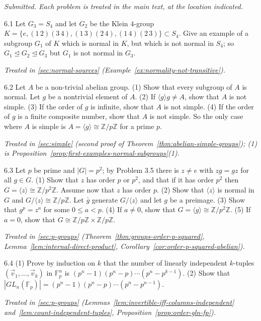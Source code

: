 \documentclass[11pt]{report}
\begin{document}
\textit{Submitted. Each problem is treated in the main text, at the location indicated.}

\begin{hwbox}{6.1}\label{hw:6.1}
Let $G_3 = S_4$ and let $G_2$ be the Klein $4$-group $K = \{e, (1\,2)(3\,4), (1\,3)(2\,4), (1\,4)(2\,3)\} \subset S_4$. Give an example of a subgroup $G_1$ of $K$ which is normal in $K$, but which is not normal in $S_4$; so $G_1 \trianglelefteq G_2 \trianglelefteq G_3$ but $G_1$ is not normal in $G_3$.
\end{hwbox}
\textit{Treated in \ref{sec:normal-sources} (Example~\ref{ex:normality-not-transitive}).}

\begin{hwbox}{6.2}\label{hw:6.2}
Let $A$ be a non-trivial abelian group. (1) Show that every subgroup of $A$ is normal. Let $g$ be a nontrivial element of $A$. (2) If $\langle g \rangle g \neq A$, show that $A$ is not simple. (3) If the order of $g$ is infinite, show that $A$ is not simple. (4) If the order of $g$ is a finite composite number, show that $A$ is not simple. So the only case where $A$ is simple is $A = \langle g \rangle \cong \mathbb{Z}/p\mathbb{Z}$ for a prime $p$.
\end{hwbox}
\textit{Treated in \ref{sec:simple} (second proof of Theorem~\ref{thm:abelian-simple-groups}); (1) is Proposition~\ref{prop:first-examples-normal-subgroups}(1).}

\begin{hwbox}{6.3}\label{hw:6.3}
Let $p$ be prime and $|G| = p^2$; by Problem 3.5 there is $z \neq e$ with $zg = gz$ for all $g \in G$. (1) Show that $z$ has order $p$ or $p^2$, and that if it has order $p^2$ then $G = \langle z \rangle \cong \mathbb{Z}/p^2\mathbb{Z}$. Assume now that $z$ has order $p$. (2) Show that $\langle z \rangle$ is normal in $G$ and $G/\langle z \rangle \cong \mathbb{Z}/p\mathbb{Z}$. Let $\bar g$ generate $G/\langle z \rangle$ and let $g$ be a preimage. (3) Show that $g^p = z^a$ for some $0 \leq a < p$. (4) If $a \neq 0$, show that $G = \langle g \rangle \cong \mathbb{Z}/p^2\mathbb{Z}$. (5) If $a = 0$, show that $G \cong \mathbb{Z}/p\mathbb{Z} \times \mathbb{Z}/p\mathbb{Z}$.
\end{hwbox}
\textit{Treated in \ref{sec:p-groups} (Theorem~\ref{thm:groups-order-p-squared}, Lemma~\ref{lem:internal-direct-product}, Corollary~\ref{cor:order-p-squared-abelian}).}

\begin{hwbox}{6.4}\label{hw:6.4}
(1) Prove by induction on $k$ that the number of linearly independent $k$-tuples $(\vec v_1, \ldots, \vec v_k)$ in $\mathbb{F}_p^n$ is $(p^n - 1)(p^n - p) \cdots (p^n - p^{k-1})$. (2) Show that $|GL_n(\mathbb{F}_p)| = (p^n - 1)(p^n - p) \cdots (p^n - p^{n-1})$.
\end{hwbox}
\textit{Treated in \ref{sec:p-groups} (Lemmas~\ref{lem:invertible-iff-columns-independent} and~\ref{lem:count-independent-tuples}, Proposition~\ref{prop:order-gln-fp}).}
\end{document}

